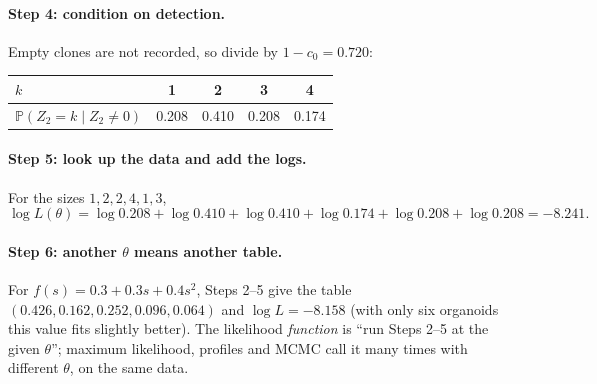 \documentclass[11pt]{article}
\theoremstyle{definition}
\theoremstyle{remark}
\newcommand{\Prob}{\mathbb{P}}
\begin{document}
\paragraph{Step 4: condition on detection.} Empty clones are not recorded, so divide by $1-c_0=0.720$:
\begin{center}\small
\begin{tabular}{@{}lcccc@{}}\toprule
$k$ & 1 & 2 & 3 & 4\\\midrule
$\Prob(Z_2=k\mid Z_2\ne0)$ & 0.208 & 0.410 & 0.208 & 0.174\\\bottomrule
\end{tabular}
\end{center}

\paragraph{Step 5: look up the data and add the logs.} For the sizes $1,2,2,4,1,3$,
\[
\log L(\theta)=\log0.208+\log0.410+\log0.410+\log0.174+\log0.208+\log0.208=-8.241 .
\]

\paragraph{Step 6: another $\theta$ means another table.} For $f(s)=0.3+0.3s+0.4s^2$, Steps 2--5 give the table $(0.426,0.162,0.252,0.096,0.064)$ and $\log L=-8.158$ (with only six organoids this value fits slightly better). The likelihood \emph{function} is ``run Steps 2--5 at the given $\theta$''; maximum likelihood, profiles and MCMC call it many times with different $\theta$, on the same data.
\end{document}
